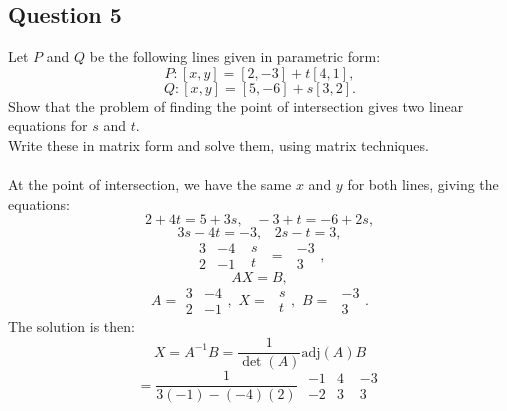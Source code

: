 \documentclass[12pt]{article}
\newcommand{\adj}{\textrm{adj}}
\begin{document}
\subsection*{Question 5}
Let $P$ and $Q$ be the following lines given in parametric form:
\[P: [x,y] = [2, -3] + t[4, 1], \]
\[ Q: [x,y] = [5, -6] + s[3, 2].\]
Show that the problem of finding the point of intersection gives two linear equations for $s$ and $t$.\\
Write these in matrix form and solve them, using matrix techniques.\\\\
At the point of intersection, we have the same $x$ and $y$ for both lines, giving the equations:
\[ 2 + 4t = 5 + 3s, \hspace{10pt} -3  + t = -6 + 2s, \]
\[ 3s - 4t = - 3, \hspace{10pt} 2s - t = 3, \]
\[  \begin{array}{|cc|}3&-4\\2&-1\end{array}\hspace{4pt}\begin{array}{|c|}s\\t\end{array} \hspace{4pt} = \hspace{4pt}\begin{array}{|c|}-3\\3\end{array},\]
\[ AX = B,\]
\[ A =  \begin{array}{|cc|}3&-4\\2&-1\end{array}, \hspace{4pt}X = \hspace{4pt}\begin{array}{|c|}s\\t\end{array}, \hspace{4pt}B = \hspace{4pt}\begin{array}{|c|}-3\\3\end{array}.\]
The solution is then:
\[ X = A^{-1}B = \frac{1}{\det(A)}\adj(A) B \]
\[ = \frac{1}{3(-1) - (-4)(2)}\hspace{4pt} \begin{array}{|cc|}-1&4\\-2&3\end{array} \hspace{4pt}\begin{array}{|c|}-3\\3\end{array}\]
\end{document}
